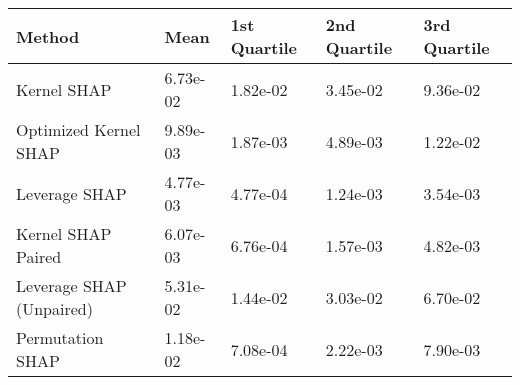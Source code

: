\begin{tabular}{lllll}
  \toprule
  \textbf{Method} & \textbf{Mean} & \textbf{1st Quartile} & \textbf{2nd Quartile} & \textbf{3rd Quartile} \\ \midrule 
Kernel SHAP & 6.73e-02 & 1.82e-02 & 3.45e-02 & 9.36e-02\\
Optimized Kernel SHAP & \cellcolor{bronze!60}9.89e-03 & 1.87e-03 & 4.89e-03 & 1.22e-02\\
Leverage SHAP & \cellcolor{gold!60}4.77e-03 & \cellcolor{gold!60}4.77e-04 & \cellcolor{gold!60}1.24e-03 & \cellcolor{gold!60}3.54e-03\\
Kernel SHAP Paired & \cellcolor{silver!60}6.07e-03 & \cellcolor{silver!60}6.76e-04 & \cellcolor{silver!60}1.57e-03 & \cellcolor{silver!60}4.82e-03\\
Leverage SHAP (Unpaired) & 5.31e-02 & 1.44e-02 & 3.03e-02 & 6.70e-02\\
Permutation SHAP & 1.18e-02 & \cellcolor{bronze!60}7.08e-04 & \cellcolor{bronze!60}2.22e-03 & \cellcolor{bronze!60}7.90e-03\\
\bottomrule
\end{tabular}
